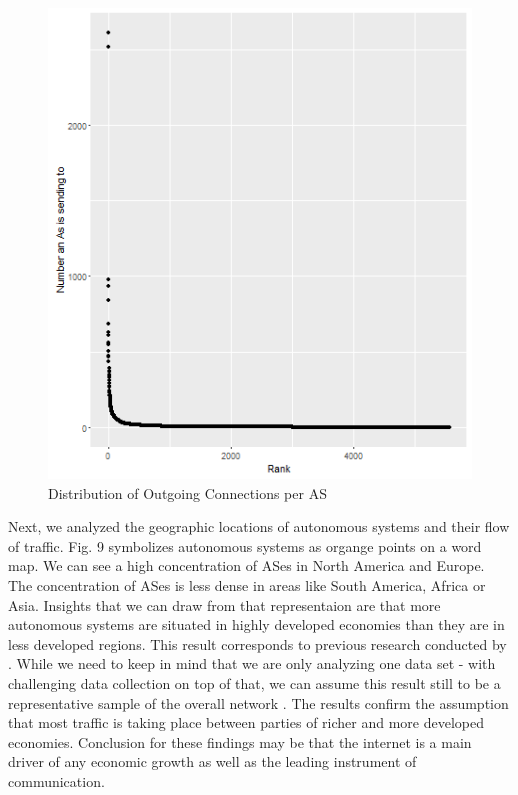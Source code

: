 \documentclass[conference, 11pt]{IEEEtran}
\begin{document}
\vspace{0.5cm}
\begin{figure}[htbp]
\centerline{\includegraphics[scale=0.4]{Graphics/AsFromDistribution.png}}
\caption{Distribution of Outgoing Connections per AS}
\label{fig}
\end{figure}
\vspace{0.5cm}


Next, we analyzed the geographic locations of autonomous systems and their flow of traffic. Fig. 9 symbolizes autonomous systems as organge points on a word map. We can see a high concentration of ASes in North America and Europe. The concentration of ASes is less dense in areas like South America, Africa or Asia. Insights that we can draw from that representaion are that more autonomous systems are situated in highly developed economies  than they are in less developed regions. This result corresponds to previous research conducted by \cite{geoResearch}. While we need to keep in mind that we are only analyzing one data set - with challenging data collection on top of that, we can assume this result still to be a representative sample of the overall network \cite{CaidaDataCollection}. The results confirm the assumption that most traffic is taking place between parties of richer and more developed economies. Conclusion for these findings may be that the internet is a main driver of any economic growth as well as the leading instrument of communication.
\end{document}
